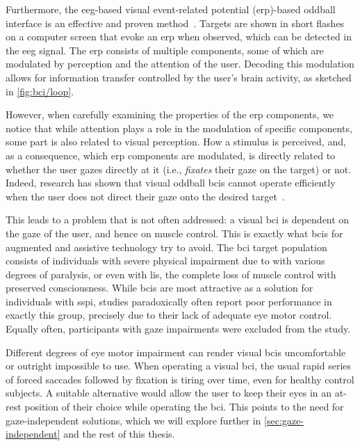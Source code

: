 Furthermore, the \ac{eeg}-based visual event-related potential (\ac{erp})-based oddball
interface is an effective and proven method~\cite{Wolpaw2018,Severens2014}.
Targets are shown in short flashes on a computer screen that evoke an \ac{erp} when
observed, which can be detected in the \ac{eeg} signal.
The \ac{erp} consists of multiple components, some of which are modulated by perception
and the attention of the user.
Decoding this modulation allows for information transfer controlled by the user's brain
activity, as sketched in \cref{fig:bci/loop}.

However, when carefully examining the properties of the \ac{erp} components, we notice
that while attention plays a role in the modulation of specific components, some part is
also related to visual perception.
How a stimulus is perceived, and, as a consequence, which \ac{erp} components are
modulated, is directly related to whether the user gazes directly at it (i.e.,
\emph{fixates} their gaze on the target) or not.
Indeed, research has shown that visual oddball \ac{bci}s cannot operate efficiently when
the user does not direct their gaze onto the desired target~\cite{Brunner2010, Frenzel2011}.

This leads to a problem that is not often addressed:
a visual \ac{bci} is dependent on the gaze of the user, and hence on muscle control.
This is exactly what \acp{bci} for augmented and assistive technology try to avoid.
The \ac{bci} target population consists of individuals with severe physical
impairment due to  with various degrees
of paralysis, or even with \ac{lis}, the complete loss of muscle control with preserved
consciousness.
While \ac{bci}s are most attractive as a solution for individuals with \ac{sspi},
studies paradoxically often report poor performance in exactly this group,
precisely due to their lack of adequate eye motor control.
Equally often, participants with gaze impairments were excluded from the study.

Different degrees of eye motor impairment can render visual \ac{bci}s uncomfortable or
outright impossible to use.
When operating a visual \ac{bci}, the usual rapid series of forced saccades followed by
fixation is tiring over time, even for healthy control subjects.
A suitable alternative would allow the user to keep their eyes in an at-rest position of
their choice while operating the \ac{bci}.
This points to the need for gaze-independent solutions, which we will explore further in
\cref{sec:gaze-independent} and the rest of this thesis.
